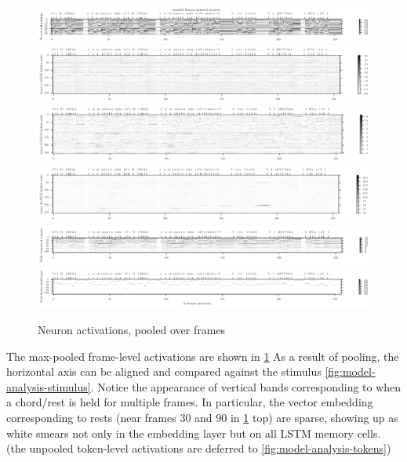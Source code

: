 \begin{figure}[p]
    \centering
    \includegraphics[width=1.0\linewidth]{model-analysis-chords-0.pdf}
    \includegraphics[width=1.0\linewidth]{model-analysis-chords-1.pdf}
    \includegraphics[width=1.0\linewidth]{model-analysis-chords-2.pdf}
    \includegraphics[width=1.0\linewidth]{model-analysis-chords-3.pdf}
    \includegraphics[width=1.0\linewidth]{model-analysis-chords-4.pdf}
    \includegraphics[width=1.0\linewidth]{model-analysis-chords-5.pdf}
    \caption{Neuron activations, pooled over frames}
    \label{fig:model-analysis-frames}
\end{figure}

The max-pooled frame-level activations are shown in
\cref{fig:model-analysis-frames} As a result of pooling, the horizontal axis
can be aligned and compared against the stimulus
\cref{fig:model-analysis-stimulus}. Notice the appearance of vertical bands
corresponding to when a chord/rest is held for multiple frames. In particular,
the vector embedding corresponding to rests (\eg near frames $30$ and $90$ in
\cref{fig:model-analysis-frames} top) are sparse, showing up as white smears
not only in the embedding layer but on all LSTM memory cells.
(the unpooled token-level activations are deferred to \vref{fig:model-analysis-tokens})

